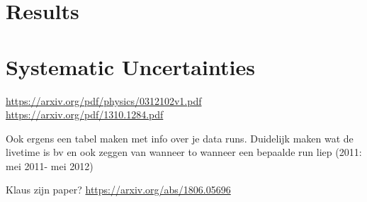 \section{Results}
\section{Systematic Uncertainties}



\url{https://arxiv.org/pdf/physics/0312102v1.pdf}\\
\url{https://arxiv.org/pdf/1310.1284.pdf}

Ook ergens een tabel maken met info over je data runs. Duidelijk maken wat de livetime is bv en ook zeggen van wanneer to wanneer een bepaalde run liep (2011: mei 2011- mei 2012)

Klaus zijn paper? \url{https://arxiv.org/abs/1806.05696}
